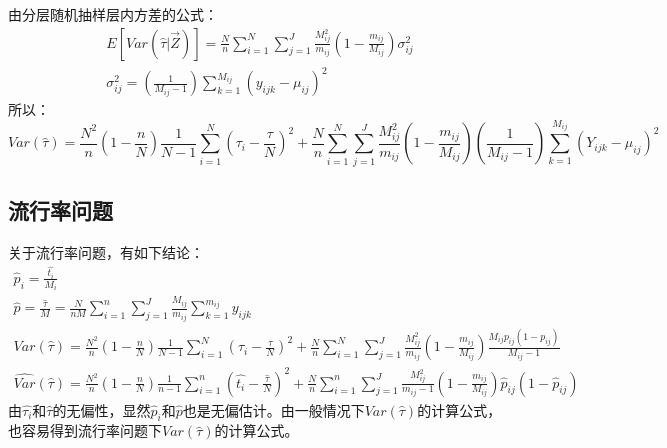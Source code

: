 由分层随机抽样层内方差的公式：
\begin{gather*}
	E[Var(\hat{\tau}|\overrightarrow{Z})]=\frac{N}{n}\sum_{i=1}^{N}\sum_{j=1}^{J}\frac{M_{ij}^2}{m_{ij}}\left(1-\frac{m_{ij}}{M_{ij}}\right)\sigma_{ij}^2 \\
	\sigma_{ij}^2=\left(\frac{1}{M_{ij}-1}\right)\sum_{k=1}^{M_{ij}}\left(y_{ijk}-\mu_{ij}\right)^2
\end{gather*}
所以：
\begin{equation*}
	Var(\hat{\tau})=\frac{N^2}{n}\left(1-\frac{n}{N}\right)\frac{1}{N-1}\sum_{i=1}^{N}\left(\tau_i-\frac{\tau}{N}\right)^2+\frac{N}{n}\sum_{i=1}^{N}\sum_{j=1}^{J}\frac{M_{ij}^2}{m_{ij}}\left(1-\frac{m_{ij}}{M_{ij}}\right)\left(\frac{1}{M_{ij}-1}\right)\sum_{k=1}^{M_{ij}}\left(Y_{ijk}-\mu_{ij}\right)^2
\end{equation*}

\subsection{流行率问题}
关于流行率问题，有如下结论：
\begin{gather*}
	\hat{p}_i=\frac{\hat{t_i}}{M_i} \\
	\hat{p}=\frac{\hat{\tau}}{M}=\frac{N}{nM}\sum_{i=1}^{n}\sum_{j=1}^{J}\frac{M_{ij}}{m_{ij}}\sum_{k=1}^{m_{ij}}y_{ijk} \\
	Var(\hat{\tau})=\frac{N^2}{n}\left(1-\frac{n}{N}\right)\frac{1}{N-1}\sum_{i=1}^{N}\left(\tau_i-\frac{\tau}{N}\right)^2+\frac{N}{n}\sum_{i=1}^{N}\sum_{j=1}^{J}\frac{M_{ij}^2}{m_{ij}}\left(1-\frac{m_{ij}}{M_{ij}}\right)\frac{M_{ij}p_{ij}(1-p_{ij})}{M_{ij}-1} \\
	\widehat{Var}(\hat{\tau})=\frac{N^2}{n}\left(1-\frac{n}{N}\right)\frac{1}{n-1}\sum_{i=1}^{n}\left(\hat{t_i}-\frac{\hat{\tau}}{N}\right)^2+\frac{N}{n}\sum_{i=1}^{n}\sum_{j=1}^{J}\frac{M_{ij}^2}{m_{ij}-1}\left(1-\frac{m_{ij}}{M_{ij}}\right)\hat{p}_{ij}(1-\hat{p}_{ij}) 
\end{gather*}
由$\hat{\tau_i}$和$\hat{\tau}$的无偏性，显然$\hat{p}_i$和$\hat{p}$也是无偏估计。由一般情况下$Var(\hat{\tau})$的计算公式，也容易得到流行率问题下$Var(\hat{\tau})$的计算公式。

